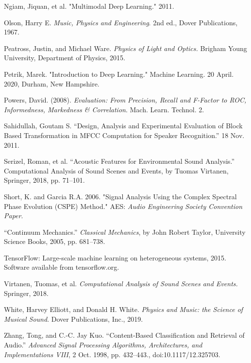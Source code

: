 \documentclass[12pt,letterpaper]{article}
\begin{document}
\begin{thebibliography}{9}
Ngiam, Jiquan, et al. "Multimodal Deep Learning." 2011. 

Olson, Harry E. \textit{Music, Physics and Engineering}. 2nd ed., Dover Publications, 1967.

Peatross, Justin, and Michael Ware. \textit{Physics of Light and Optics.} Brigham Young University, Department of Physics, 2015.

Petrik, Marek. "Introduction to Deep Learning." Machine Learning. 20 April. 2020, Durham, New Hampshire.

Powers, David. (2008). \textit{Evaluation: From Precision, Recall and F-Factor to ROC, Informedness, Markedness \& Correlation}. Mach. Learn. Technol. 2. 

Sahidullah, Goutam S. “Design, Analysis and Experimental Evaluation of Block Based Transformation in MFCC Computation for Speaker Recognition.” 18 Nov. 2011. 

Serizel, Roman, et al. “Acoustic Features for Environmental Sound Analysis.” Computational Analysis of Sound Scenes and Events, by Tuomas Virtanen, Springer, 2018, pp. 71–101. 

Short, K. and Garcia R.A. 2006. "Signal Analysis Using the Complex Spectral Phase Evolution (CSPE) Method." AES: \textit{Audio Engineering Society Convention Paper}.

“Continuum Mechanics.” \textit{Classical Mechanics}, by John Robert Taylor, University Science Books, 2005, pp. 681–738. 

TensorFlow: Large-scale machine learning on heterogeneous systems,
2015. Software available from tensorflow.org.

Virtanen, Tuomas, et al. \textit{Computational Analysis of Sound Scenes and Events.} Springer, 2018.

White, Harvey Elliott, and Donald H. White. \textit{Physics and Music: the Science of Musical Sound}. Dover Publications, Inc., 2019.

Zhang, Tong, and C.-C. Jay Kuo. “Content-Based Classification and Retrieval of Audio.” \textit{Advanced Signal Processing Algorithms, Architectures, and Implementations VIII}, 2 Oct. 1998, pp. 432–443., doi:10.1117/12.325703.

\end{thebibliography}

\end{document}
